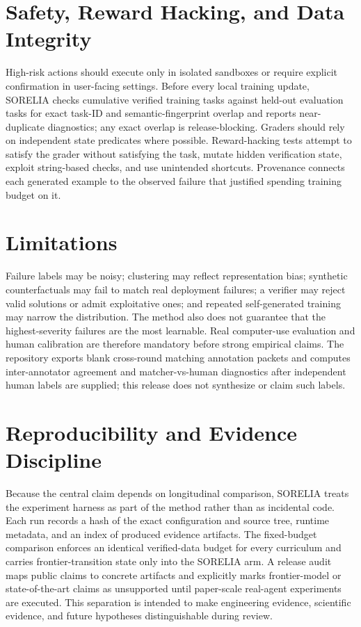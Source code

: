 \documentclass{article}
\begin{document}
\section{Safety, Reward Hacking, and Data Integrity}
High-risk actions should execute only in isolated sandboxes or require explicit confirmation in user-facing settings. Before every local training update, SORELIA checks cumulative verified training tasks against held-out evaluation tasks for exact task-ID and semantic-fingerprint overlap and reports near-duplicate diagnostics; any exact overlap is release-blocking. Graders should rely on independent state predicates where possible. Reward-hacking tests attempt to satisfy the grader without satisfying the task, mutate hidden verification state, exploit string-based checks, and use unintended shortcuts. Provenance connects each generated example to the observed failure that justified spending training budget on it.

\section{Limitations}
Failure labels may be noisy; clustering may reflect representation bias; synthetic counterfactuals may fail to match real deployment failures; a verifier may reject valid solutions or admit exploitative ones; and repeated self-generated training may narrow the distribution. The method also does not guarantee that the highest-severity failures are the most learnable. Real computer-use evaluation and human calibration are therefore mandatory before strong empirical claims. The repository exports blank cross-round matching annotation packets and computes inter-annotator agreement and matcher-vs-human diagnostics after independent human labels are supplied; this release does not synthesize or claim such labels.


\section{Reproducibility and Evidence Discipline}
Because the central claim depends on longitudinal comparison, SORELIA treats the experiment harness as part of the method rather than as incidental code. Each run records a hash of the exact configuration and source tree, runtime metadata, and an index of produced evidence artifacts. The fixed-budget comparison enforces an identical verified-data budget for every curriculum and carries frontier-transition state only into the SORELIA arm. A release audit maps public claims to concrete artifacts and explicitly marks frontier-model or state-of-the-art claims as unsupported until paper-scale real-agent experiments are executed. This separation is intended to make engineering evidence, scientific evidence, and future hypotheses distinguishable during review.
\end{document}
